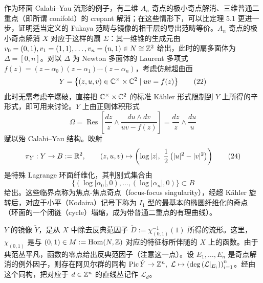 作为环面 Calabi--Yau 流形的例子，有二维 $A_n$ 奇点的极小奇点解消、三维普通二重点（即所谓 conifold）的 crepant 解消；在这些情形下，可以比定理 5.1 更进一步，证明适当定义的 Fukaya 范畴与镜像的相干层的导出范畴等价。$A_n$ 奇点的极小奇点解消 $X$ 对应于这样的扇 $\Sigma$：其一维锥的生成元由 $v_0=(0,1),v_1=(1,1),\dots,v_n=(n,1)\in N\cong\mathbb{Z}^2$ 给出，此时的扇多面体为 $\Delta=[0,n]$。对以 $\Delta$ 为 Newton 多面体的 Laurent 多项式 $f(z)=(z-\alpha_0)(z-\alpha_1)\cdots(z-\alpha_n)$，考虑仿射超曲面
\begin{equation}
Y=\left\{(z,u,v)\in\mathbb{C}^\times\times\mathbb{C}^2\mid uv=f(z)\right\}
\tag{22}
\end{equation}
\noindent 此时无需考虑辛爆破，直接把 $\mathbb{C}^\times\times\mathbb{C}^2$ 的标准 K\"ahler 形式限制到 $Y$ 上所得的辛形式，即可用来讨论。$Y$ 上由正则体积形式
\begin{equation}
\Omega=\operatorname{Res}\left[\frac{dz}{z}\wedge\frac{du\wedge dv}{uv-f(z)}\right]=\frac{dz}{z}\wedge\frac{du}{u}
\tag{23}
\end{equation}
\noindent 赋以殆 Calabi--Yau 结构。映射
\begin{equation}
\pi_Y:Y\to B:=\mathbb{R}^2,\qquad (z,u,v)\mapsto\left(\log|z|,\ \frac{1}{2}\left(|u|^2-|v|^2\right)\right)
\tag{24}
\end{equation}
\noindent 是特殊 Lagrange 环面纤维化，其判别式集合由
\begin{equation}
\{(\log|\alpha_0|,0),\dots,(\log|\alpha_n|,0)\}\subset B
\tag{25}
\end{equation}
\noindent 给出。这些临界点称为焦点-焦点奇点（focus-focus singularity），经超 K\"ahler 旋转后，对应于小平（Kodaira）记号下称为 $I_1$ 型的最基本的椭圆纤维化的奇点（环面的一个闭链（cycle）塌缩，成为带普通二重点的有理曲线）。

$Y$ 的镜像 $\check Y$，是从 $X$ 中除去反典范因子 $\check D:=\chi_{(0,1)}^{-1}(1)$ 所得的流形。这里，$\chi_{(0,1)}$ 是与 $(0,1)\in M:=\operatorname{Hom}(N,\mathbb{Z})$ 对应的特征标所伴随的 $X$ 上的函数。由于典范丛平凡，函数的零点给出反典范因子（注意这一点）。设 $E_1,\dots,E_n$ 是奇点解消的例外因子，则存在阿贝尔群的同构 $\operatorname{Pic}\check Y\to\mathbb{Z}^n,\ \mathcal L\mapsto\left(\deg\left(\mathcal L|_{E_i}\right)\right)_{i=1}^{n}$。经由这个同构，把对应于 $d\in\mathbb{Z}^n$ 的直线丛记作 $\mathcal L_d$。

